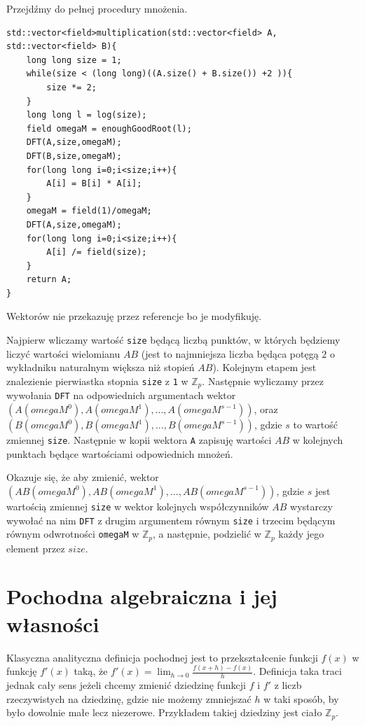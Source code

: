 \documentclass{article}
\begin{document}
Przejdźmy do pełnej procedury mnożenia. 
\begin{lstlisting}
std::vector<field>multiplication(std::vector<field> A, std::vector<field> B){
    long long size = 1;
    while(size < (long long)((A.size() + B.size()) +2 )){
        size *= 2;
    }
    long long l = log(size);
    field omegaM = enoughGoodRoot(l);
    DFT(A,size,omegaM);  
    DFT(B,size,omegaM);
    for(long long i=0;i<size;i++){
        A[i] = B[i] * A[i]; 
    }
    omegaM = field(1)/omegaM;
    DFT(A,size,omegaM);
    for(long long i=0;i<size;i++){
        A[i] /= field(size);
    } 
    return A;
}
\end{lstlisting}
Wektorów nie przekazuję przez referencje bo je modyfikuję.

Najpierw wliczamy wartość \texttt{size} będącą liczbą punktów, w których będziemy liczyć wartości wielomianu $AB$ (jest to najmniejsza liczba będąca potęgą 
$2$ o wykładniku naturalnym większa niż stopień $AB$). Kolejnym etapem jest znalezienie pierwiastka stopnia \texttt{size} z \texttt{1} w $\mathbb{Z}_p$. 
Następnie wyliczamy przez wywołania \texttt{DFT} na odpowiednich argumentach wektor $(A(omegaM^0),A(omegaM^1),...,A(omegaM^{s-1}))$, 
oraz $(B(omegaM^0),B(omegaM^1),...,B(omegaM^{s-1}))$, gdzie $s$
to wartość zmiennej \texttt{size}. Następnie w kopii wektora \texttt{A} zapisuję wartości $AB$ w kolejnych punktach będące wartościami odpowiednich 
mnożeń.

Okazuje się, że aby zmienić, wektor $(AB(omegaM^0),AB(omegaM^1),...,AB(omegaM^{s-1}))$, gdzie $s$ jest wartością zmiennej \texttt{size}
w wektor kolejnych współczynników $AB$ wystarczy wywołać na nim \texttt{DFT} z drugim argumentem równym \texttt{size} i trzecim 
będącym równym odwrotności \texttt{omegaM} w $\mathbb{Z}_p$, a następnie, podzielić w $\mathbb{Z}_p$ każdy jego element przez $size$. 























\section{Pochodna algebraiczna i jej własności}
Klasyczna analityczna definicja pochodnej jest to przekształcenie funkcji $f(x)$ w funkcję $f'(x)$ taką, że
$f'(x)=\lim_{h \to 0}\frac{f(x+h)-f(x)}{h}$. Definicja taka traci jednak cały sens jeżeli chcemy zmienić dziedzinę
funkcji $f$ i $f'$ z liczb rzeczywistych na dziedzinę, gdzie nie możemy zmniejszać $h$ w taki sposób, by było 
dowolnie małe lecz niezerowe. Przykładem takiej dziedziny jest ciało $\mathbb{Z}_p$. 
\end{document}

